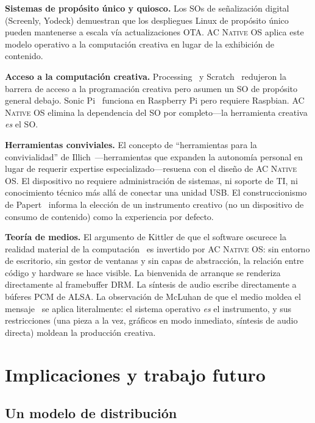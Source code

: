 \documentclass[10pt,letterpaper,twocolumn]{article}
\newcommand{\acos}{\textsc{AC Native OS}}
\begin{document}
\textbf{Sistemas de propósito único y quiosco.} Los SOs de señalización digital (Screenly, Yodeck) demuestran que los despliegues Linux de propósito único pueden mantenerse a escala vía actualizaciones OTA. \acos{} aplica este modelo operativo a la computación creativa en lugar de la exhibición de contenido.

\textbf{Acceso a la computación creativa.} Processing~\citep{reas2007processing} y Scratch~\citep{resnick2009scratch} redujeron la barrera de acceso a la programación creativa pero asumen un SO de propósito general debajo. Sonic Pi~\citep{aaron2016sonic} funciona en Raspberry Pi pero requiere Raspbian. \acos{} elimina la dependencia del SO por completo---la herramienta creativa \emph{es} el SO.

\textbf{Herramientas conviviales.} El concepto de ``herramientas para la convivialidad'' de Illich~\citep{illich1973tools}---herramientas que expanden la autonomía personal en lugar de requerir expertise especializado---resuena con el diseño de \acos{}. El dispositivo no requiere administración de sistemas, ni soporte de TI, ni conocimiento técnico más allá de conectar una unidad USB. El construccionismo de Papert~\citep{papert1980mindstorms} informa la elección de un instrumento creativo (no un dispositivo de consumo de contenido) como la experiencia por defecto.

\textbf{Teoría de medios.} El argumento de Kittler de que el software oscurece la realidad material de la computación~\citep{kittler1995no} es invertido por \acos{}: sin entorno de escritorio, sin gestor de ventanas y sin capas de abstracción, la relación entre código y hardware se hace visible. La bienvenida de arranque se renderiza directamente al framebuffer DRM. La síntesis de audio escribe directamente a búferes PCM de ALSA. La observación de McLuhan de que el medio moldea el mensaje~\citep{mcluhan1964understanding} se aplica literalmente: el sistema operativo \emph{es} el instrumento, y sus restricciones (una pieza a la vez, gráficos en modo inmediato, síntesis de audio directa) moldean la producción creativa.

\section{Implicaciones y trabajo futuro}
\label{sec:implications}

\subsection{Un modelo de distribución}
\end{document}
